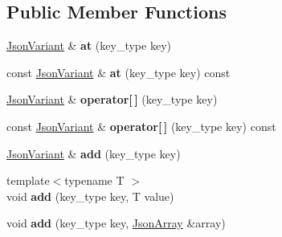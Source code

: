 \subsection*{Public Member Functions}
\begin{DoxyCompactItemize}
\item 
\hypertarget{class_arduino_json_1_1_json_object_a0fbdca087f954401040f1193859c0b1c}{}\hyperlink{class_arduino_json_1_1_json_variant}{Json\+Variant} \& {\bfseries at} (key\+\_\+type key)\label{class_arduino_json_1_1_json_object_a0fbdca087f954401040f1193859c0b1c}

\item 
\hypertarget{class_arduino_json_1_1_json_object_a9e4bbb0e9194c7ae721d2d3136c1a5c3}{}const \hyperlink{class_arduino_json_1_1_json_variant}{Json\+Variant} \& {\bfseries at} (key\+\_\+type key) const \label{class_arduino_json_1_1_json_object_a9e4bbb0e9194c7ae721d2d3136c1a5c3}

\item 
\hypertarget{class_arduino_json_1_1_json_object_a027690ac3907d62f353cef1bbf320b7d}{}\hyperlink{class_arduino_json_1_1_json_variant}{Json\+Variant} \& {\bfseries operator\mbox{[}$\,$\mbox{]}} (key\+\_\+type key)\label{class_arduino_json_1_1_json_object_a027690ac3907d62f353cef1bbf320b7d}

\item 
\hypertarget{class_arduino_json_1_1_json_object_ac8b89a3f8303a09fd00c7b2fd40ccf91}{}const \hyperlink{class_arduino_json_1_1_json_variant}{Json\+Variant} \& {\bfseries operator\mbox{[}$\,$\mbox{]}} (key\+\_\+type key) const \label{class_arduino_json_1_1_json_object_ac8b89a3f8303a09fd00c7b2fd40ccf91}

\item 
\hypertarget{class_arduino_json_1_1_json_object_aa15fa8f32ad39bdf7558948fc4c713bf}{}\hyperlink{class_arduino_json_1_1_json_variant}{Json\+Variant} \& {\bfseries add} (key\+\_\+type key)\label{class_arduino_json_1_1_json_object_aa15fa8f32ad39bdf7558948fc4c713bf}

\item 
\hypertarget{class_arduino_json_1_1_json_object_a2347439c241c0b49092a17f160d822a8}{}{\footnotesize template$<$typename T $>$ }\\void {\bfseries add} (key\+\_\+type key, T value)\label{class_arduino_json_1_1_json_object_a2347439c241c0b49092a17f160d822a8}

\item 
\hypertarget{class_arduino_json_1_1_json_object_a47240bdd28cced7dfbeab302413927be}{}void {\bfseries add} (key\+\_\+type key, \hyperlink{class_arduino_json_1_1_json_array}{Json\+Array} \&array)\label{class_arduino_json_1_1_json_object_a47240bdd28cced7dfbeab302413927be}


\end{DoxyCompactItemize}
